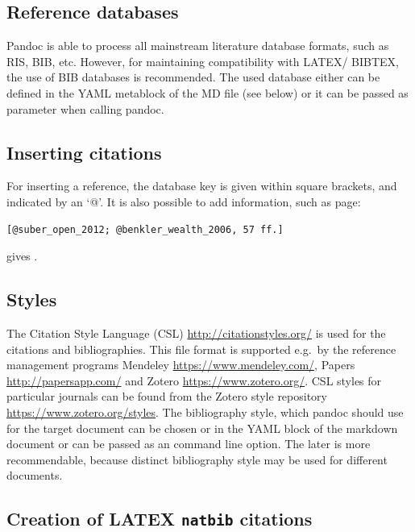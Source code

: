 \documentclass[10pt,fleqn]{wlpeerj}
\begin{document}
\subsection{Reference
databases}\label{reference-databases}

Pandoc
is
able
to
process
all
mainstream
literature
database
formats,
such
as
RIS,
BIB,
etc.
However,
for
maintaining
compatibility
with
LATEX/
BIBTEX,
the
use
of
BIB
databases
is
recommended.
The
used
database
either
can
be
defined
in
the
YAML
metablock
of
the
MD
file
(see
below)
or it
can
be
passed
as
parameter
when
calling
pandoc.

\subsection{Inserting
citations}\label{inserting-citations}

For
inserting
a
reference,
the
database
key
is
given
within
square
brackets,
and
indicated
by an
`@'.
It is
also
possible
to
add
information,
such
as
page:

\begin{verbatim}
[@suber_open_2012; @benkler_wealth_2006, 57 ff.]
\end{verbatim}

gives
\citep[57
ff.]{suber_open_2012, benkler_wealth_2006}.

\subsection{Styles}\label{styles}

The
Citation
Style
Language
(CSL)
\url{http://citationstyles.org/}
is
used
for
the
citations
and
bibliographies.
This
file
format
is
supported
e.g.~by
the
reference
management
programs
Mendeley
\url{https://www.mendeley.com/},
Papers
\url{http://papersapp.com/}
and
Zotero
\url{https://www.zotero.org/}.
CSL
styles
for
particular
journals
can
be
found
from
the
Zotero
style
repository
\url{https://www.zotero.org/styles}.
The
bibliography
style,
which
pandoc
should
use
for
the
target
document
can
be
chosen
or in
the
YAML
block
of
the
markdown
document
or
can
be
passed
as an
command
line
option.
The
later
is
more
recommendable,
because
distinct
bibliography
style
may
be
used
for
different
documents.

\subsection{\texorpdfstring{Creation
of
LATEX
\texttt{natbib}
citations}{Creation of LATEX natbib citations}}\label{creation-of-latex-natbib-citations}
\end{document}
